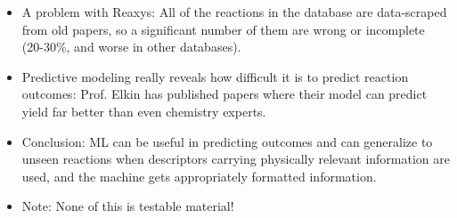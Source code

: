 \documentclass[../notes.tex]{subfiles}
\begin{document}
\begin{itemize}
    \item A problem with Reaxys: All of the reactions in the database are data-scraped from old papers, so a significant number of them are wrong or incomplete (20-30\%, and worse in other databases).
    \item Predictive modeling really reveals how difficult it is to predict reaction outcomes: Prof. Elkin has published papers where their model can predict yield far better than even chemistry experts.
    \item Conclusion: ML can be useful in predicting outcomes and can generalize to unseen reactions when descriptors carrying physically relevant information are used, and the machine gets appropriately formatted information.
    \item Note: None of this is testable material!
\end{itemize}
\end{document}

